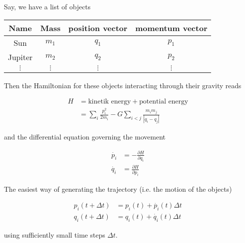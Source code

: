 \documentclass{amsart}
\begin{document}
\thispagestyle{empty}

Say, we have a list of objects
\vspace{2em}
\begin{center}
\begin{tabular}{c c c c}
  \hline
  Name & Mass & position vector & momentum vector\\
  \hline
  Sun & $m_1$ & $q_1$ & $p_1$ \\
  Jupiter & $m_2$ & $q_2$ & $p_2$ \\
  $\vdots$ & $\vdots$ & $\vdots$ & $\vdots$\\
  \hline
\end{tabular}
\end{center}
\vspace{2em}
Then the Hamiltonian for these objects interacting through their gravity reads

\begin{align*}
  H &= \text{kinetik energy} + \text{potential energy}\\
  &= \sum_i \frac{p_i^2}{2m_i} - G\sum_{i<j}\frac{m_im_j}{|q_i-q_j|} 
\end{align*}

and the differential equation governing the movement

\begin{align*}
  \dot{p_i} &= -\frac{\partial H}{\partial q_i}\\
  \dot{q_i} &= \frac{\partial H}{\partial p_i}
\end{align*}

The easiest way of generating the trajectory (i.e. the motion of the objects)

\begin{align*}
  p_i(t + \Delta t) &= p_i(t) + \dot{p_i}(t)\Delta t \\
 q_i(t + \Delta t) &= q_i(t) + \dot{q_i}(t)\Delta t
\end{align*}

using sufficiently small time steps $\Delta t$.
\end{document}
